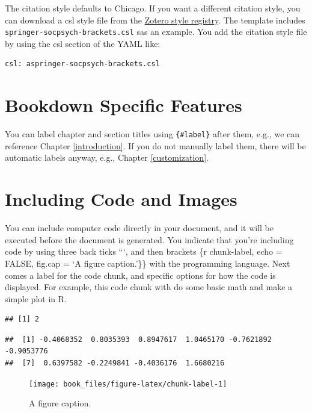 \documentclass[]{tufte-book}
\begin{document}
The citation style defaults to Chicago. If you want a different citation
style, you can download a csl style file from the
\href{https://www.zotero.org/styles}{Zotero style registry}. The
template includes \texttt{springer-socpsych-brackets.csl} sas an
example. You add the citation style file by using the csl section of the
YAML like:

\begin{verbatim}
csl: aspringer-socpsych-brackets.csl
\end{verbatim}

\section{Bookdown Specific Features}\label{bookdown-specific-features}

You can label chapter and section titles using \texttt{\{\#label\}}
after them, e.g., we can reference Chapter \ref{introduction}. If you do
not manually label them, there will be automatic labels anyway, e.g.,
Chapter \ref{customization}.

\section{Including Code and Images}\label{including-code-and-images}

You can include computer code directly in your document, and it will be
executed before the document is generated. You indicate that you're
including code by using three back ticks ```, and then brackets \{r
chunk-label, echo = FALSE, fig.cap = `A figure caption.'\}\} with the
programming language. Next comes a label for the code chunk, and
specific options for how the code is displayed. For example, this code
chunk with do some basic math and make a simple plot in R.

\begin{verbatim}
## [1] 2
\end{verbatim}

\begin{verbatim}
##  [1] -0.4068352  0.8035393  0.8947617  1.0465170 -0.7621892 -0.9053776
##  [7]  0.6397582 -0.2249841 -0.4036176  1.6680216
\end{verbatim}

\begin{figure}
\texttt{[image: book\_files/figure-latex/chunk-label-1]} \caption[A figure caption]{A figure caption.}\label{fig:chunk-label}
\end{figure}
\end{document}
